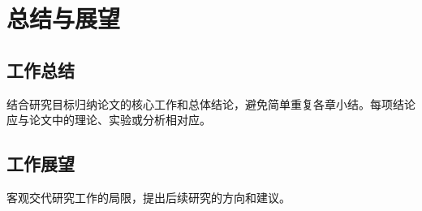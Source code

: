 \chapter{总结与展望}
\section{工作总结}
结合研究目标归纳论文的核心工作和总体结论，避免简单重复各章小结。每项结论应与论文中的理论、实验或分析相对应。
\section{工作展望}
客观交代研究工作的局限，提出后续研究的方向和建议。
